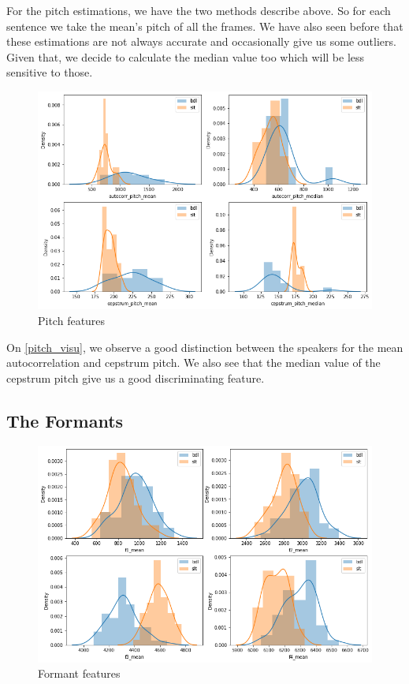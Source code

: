 \documentclass[]{article}
\begin{document}
For the pitch estimations, we have the two methods describe above. So for each sentence 
we take the mean's pitch of all the frames. We have also seen before that these estimations are
not always accurate and occasionally give us some outliers. Given that, we decide to calculate
the median value too which will be less sensitive to those.


\begin{figure}[H]
    \centering
    \caption{Pitch features}
    \label{pitch_visu}
    \includegraphics[scale=0.5]{images/pitch_visu.png} 
\end{figure}


On \autoref{pitch_visu}, we observe a good distinction between the speakers for the mean autocorrelation
and cepstrum pitch. We also see that the median value of the cepstrum pitch give us a good
discriminating feature.

\subsection{The Formants}


\begin{figure}[H]
    \centering
    \caption{\label{formants_visu}Formant features}
    \includegraphics[scale=0.5]{images/formants_visu.png}
\end{figure}
\end{document}
